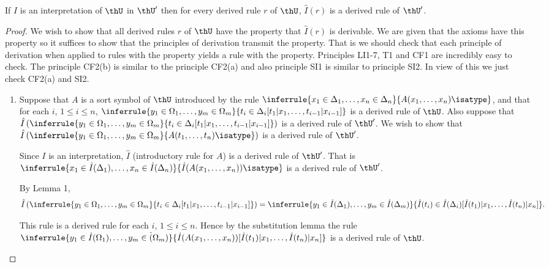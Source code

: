   \begin{lemma}[2]
    If $I$ is an interpretation of $\thU$ in $\thU'$ then for every derived rule $r$ of $\thU$, $\hat I(r)$ is a derived rule of $\thU'$.
  \end{lemma}
  \begin{proof}
    We wish to show that all derived rules $r$ of $\thU$ have the property that $\hat I(r)$ is derivable.
    We are given that the axioms have this property so it suffices to show that the principles of derivation transmit the property.
    That is we should check that each principle of derivation when applied to rules with the property yields a rule with the property.
    Principles LI1-7, T1 and CF1 are incredibly easy to check.
    The principle CF2(b) is similar to the principle CF2(a) and also principle SI1 is similar to principle SI2.
    In view of this we just check CF2(a) and SI2.

    \begin{enumerate}
      \item[CF2(a)] Suppose that $A$ is a sort symbol of $\thU$ introduced by the rule $\inferrule{x_1\in\Delta_1,\ldots,x_n\in\Delta_n}{A(x_1,\ldots,x_n)\isatype}$, and that for each $i$, $1\leq i\leq n$, $\inferrule{y_1\in\Omega_1,\ldots,y_m\in\Omega_m}{t_i\in\Delta_i[t_1|x_1,\ldots,t_{i-1}|x_{i-1}]}$ is a derived rule of $\thU$.
        Also suppose that $\hat I\left(\inferrule{y_1\in\Omega_1,\ldots,y_m\in\Omega_m}{t_i\in\Delta_i[t_1|x_1,\ldots,t_{i-1}|x_{i-1}]}\right)$ is a derived rule of $\thU'$.
        We wish to show that $\hat I\left(\inferrule{y_1\in\Omega_1,\ldots,y_m\in\Omega_m}{A(t_1,\ldots,t_n)\isatype}\right)$ is a derived rule of $\thU'$.

        Since $I$ is an interpretation, $\hat I$ (introductory rule for $A$) is a derived rule of $\thU'$.
        That is $\inferrule{x_1\in\dot I(\Delta_1),\ldots,x_n\in\dot I(\Delta_n)}{\dot I(A(x_1,\ldots,x_n))\isatype}$ is a derived rule of $\thU'$.

        By Lemma 1,
        \[\hat I\left(\inferrule{y_1\in\Omega_1,\ldots,y_m\in\Omega_m}{t_i\in\Delta_i[t_1|x_1,\ldots,t_{i-1}|x_{i-1}]}\right) = \inferrule{y_1\in\dot I(\Delta_1),\ldots,y_m\in\dot I(\Delta_m)}{\dot I(t_i)\in\dot I(\Delta_i)[\dot I(t_1)|x_1,\ldots,\dot I(t_n)|x_n]}.\]

        This rule is a derived rule for each $i$, $1\leq i\leq n$.
        Hence by the substitution lemma the rule $\inferrule{y_1\in\dot I(\Omega_1),\ldots,y_m\in\dot (\Omega_m)}{\dot I(A(x_1,\ldots,x_n))[\dot I(t_1)|x_1,\ldots,\dot I(t_n)|x_n]}$ is a derived rule of $\thU$.


\end{enumerate}
\end{proof}
